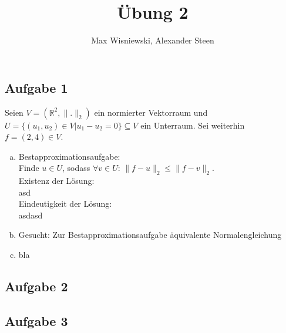 \documentclass[11pt,a4paper,ngerman]{article}
\date{}
\title{Übung 2}
\author{Max Wisniewski, Alexander Steen}
\begin{document}

\renewcommand{\figurename}{Figure}

\maketitle
\thispagestyle{fancy}


\subsection*{Aufgabe 1}
Seien $V = (\mathbb{R}^2,\| . \|_2)$ ein normierter Vektorraum und
$U = \{(u_1,u_2) \in V| u_1 - u_2 = 0 \} \subseteq V$ ein Unterraum. Sei weiterhin $f = (2,4) \in V$.

\begin{enumerate}[a)]
\item Bestapproximationsaufgabe: \\
      Finde $u \in U$, sodass $\forall v \in U: \, \|f-u\|_2 \leq \|f-v\|_2$. \\
      Existenz der Lösung: \\
      asd \\
      Eindeutigkeit der Lösung: \\
      asdasd
      
\item Gesucht: Zur Bestapproximationsaufgabe äquivalente Normalengleichung 
\item bla
\end{enumerate}
\subsection*{Aufgabe 2}
\subsection*{Aufgabe 3}

\label{LastPage}
\end{document}
